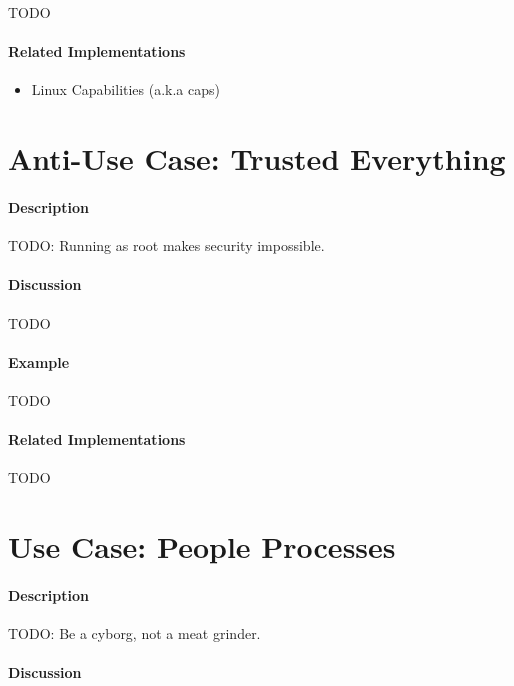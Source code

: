 {\Large TODO}

\paragraph{Related Implementations}

\begin{itemize}
	\item Linux\texttrademark{} Capabilities (a.k.a \textsf{caps})
\end{itemize}

\section{Anti-Use Case: Trusted Everything}

\paragraph{Description}

{\Large TODO:} Running as root makes security impossible.

\paragraph{Discussion}

{\Large TODO}

\paragraph{Example}

{\Large TODO}

\paragraph{Related Implementations}

{\Large TODO}

\section{Use Case: People Processes}

\paragraph{Description}

{\Large TODO:} Be a cyborg, not a meat grinder.

\paragraph{Discussion}

